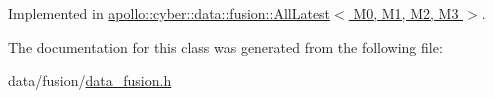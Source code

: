 Implemented in \hyperlink{classapollo_1_1cyber_1_1data_1_1fusion_1_1AllLatest_a44540e0552d2d451372e9f591ad0e3a0}{apollo\-::cyber\-::data\-::fusion\-::\-All\-Latest$<$ M0, M1, M2, M3 $>$}.



The documentation for this class was generated from the following file\-:\begin{DoxyCompactItemize}
\item 
data/fusion/\hyperlink{data__fusion_8h}{data\-\_\-fusion.\-h}\end{DoxyCompactItemize}
